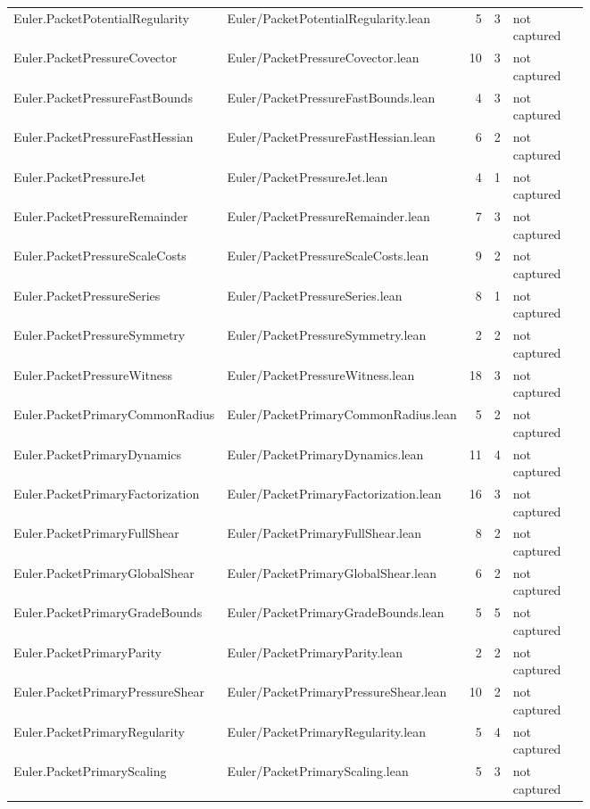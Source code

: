\documentclass[10pt]{article}
\begin{document}
\begin{longtable}{p{0.28\linewidth}p{0.27\linewidth}r r p{0.20\linewidth}}
Euler.PacketPotentialRegularity & Euler/PacketPotentialRegularity.lean & 5 & 3 & not captured\\
Euler.PacketPressureCovector & Euler/PacketPressureCovector.lean & 10 & 3 & not captured\\
Euler.PacketPressureFastBounds & Euler/PacketPressureFastBounds.lean & 4 & 3 & not captured\\
Euler.PacketPressureFastHessian & Euler/PacketPressureFastHessian.lean & 6 & 2 & not captured\\
Euler.PacketPressureJet & Euler/PacketPressureJet.lean & 4 & 1 & not captured\\
Euler.PacketPressureRemainder & Euler/PacketPressureRemainder.lean & 7 & 3 & not captured\\
Euler.PacketPressureScaleCosts & Euler/PacketPressureScaleCosts.lean & 9 & 2 & not captured\\
Euler.PacketPressureSeries & Euler/PacketPressureSeries.lean & 8 & 1 & not captured\\
Euler.PacketPressureSymmetry & Euler/PacketPressureSymmetry.lean & 2 & 2 & not captured\\
Euler.PacketPressureWitness & Euler/PacketPressureWitness.lean & 18 & 3 & not captured\\
Euler.PacketPrimaryCommonRadius & Euler/PacketPrimaryCommonRadius.lean & 5 & 2 & not captured\\
Euler.PacketPrimaryDynamics & Euler/PacketPrimaryDynamics.lean & 11 & 4 & not captured\\
Euler.PacketPrimaryFactorization & Euler/PacketPrimaryFactorization.lean & 16 & 3 & not captured\\
Euler.PacketPrimaryFullShear & Euler/PacketPrimaryFullShear.lean & 8 & 2 & not captured\\
Euler.PacketPrimaryGlobalShear & Euler/PacketPrimaryGlobalShear.lean & 6 & 2 & not captured\\
Euler.PacketPrimaryGradeBounds & Euler/PacketPrimaryGradeBounds.lean & 5 & 5 & not captured\\
Euler.PacketPrimaryParity & Euler/PacketPrimaryParity.lean & 2 & 2 & not captured\\
Euler.PacketPrimaryPressureShear & Euler/PacketPrimaryPressureShear.lean & 10 & 2 & not captured\\
Euler.PacketPrimaryRegularity & Euler/PacketPrimaryRegularity.lean & 5 & 4 & not captured\\
Euler.PacketPrimaryScaling & Euler/PacketPrimaryScaling.lean & 5 & 3 & not captured\\

\end{longtable}
\end{document}
